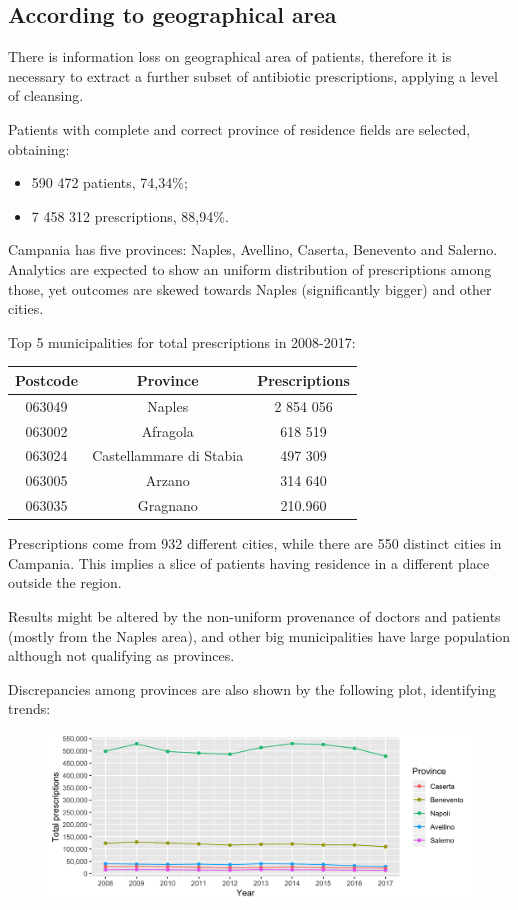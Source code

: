 \subsection{According to geographical area}
There is information loss on geographical area of patients, therefore it is necessary to extract a further subset of antibiotic prescriptions, applying a level of cleansing.

Patients with complete and correct province of residence fields are selected, obtaining:
\begin{itemize}
	\item 590 472 patients, 74,34\%;
	\item 7 458 312 prescriptions, 88,94\%.
\end{itemize}

Campania has five provinces: Naples, Avellino, Caserta, Benevento and Salerno. Analytics are expected to show an uniform distribution of prescriptions among those, yet outcomes are skewed towards Naples (significantly bigger) and other cities.

Top 5 municipalities for total prescriptions in 2008-2017:
\begin{center}
	\begin{tabular}{c|c|c}
		Postcode & Province & Prescriptions \\
		\hline
		063049 & Naples & 2 854 056 \\
		\hline
		063002 & Afragola & 618 519 \\
		\hline
		063024 & Castellammare di Stabia & 497 309 \\
		\hline
		063005 & Arzano & 314 640 \\
		\hline
		063035 & Gragnano & 210.960 \\
	\end{tabular}
\end{center}

Prescriptions come from 932 different cities, while there are 550 distinct cities in Campania. This implies a slice of patients having residence in a different place outside the region.

Results might be altered by the non-uniform provenance of doctors and patients (mostly from the Naples area), and other big municipalities have large population although not qualifying as provinces. 

Discrepancies among provinces are also shown by the following plot, identifying trends:
\begin{figure}[h]
	\centering
	\includegraphics[scale=0.3]{../plots/provinces.png}
\end{figure}

